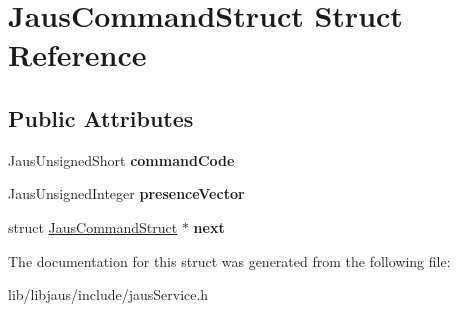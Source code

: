 \hypertarget{struct_jaus_command_struct}{\section{\-Jaus\-Command\-Struct \-Struct \-Reference}
\label{struct_jaus_command_struct}
}
\subsection*{\-Public \-Attributes}
\begin{DoxyCompactItemize}
\item 
\hypertarget{struct_jaus_command_struct_a6052991e8e0c04c7c6c2cd8627ec01d7}{\-Jaus\-Unsigned\-Short {\bfseries command\-Code}}\label{struct_jaus_command_struct_a6052991e8e0c04c7c6c2cd8627ec01d7}

\item 
\hypertarget{struct_jaus_command_struct_a0e2a81dc24c71d7ba7493ccd9080ce19}{\-Jaus\-Unsigned\-Integer {\bfseries presence\-Vector}}\label{struct_jaus_command_struct_a0e2a81dc24c71d7ba7493ccd9080ce19}

\item 
\hypertarget{struct_jaus_command_struct_a64062d4229ec98edd256094a6a8a3833}{struct \hyperlink{struct_jaus_command_struct}{\-Jaus\-Command\-Struct} $\ast$ {\bfseries next}}\label{struct_jaus_command_struct_a64062d4229ec98edd256094a6a8a3833}

\end{DoxyCompactItemize}


\-The documentation for this struct was generated from the following file\-:\begin{DoxyCompactItemize}
\item 
lib/libjaus/include/jaus\-Service.\-h\end{DoxyCompactItemize}
